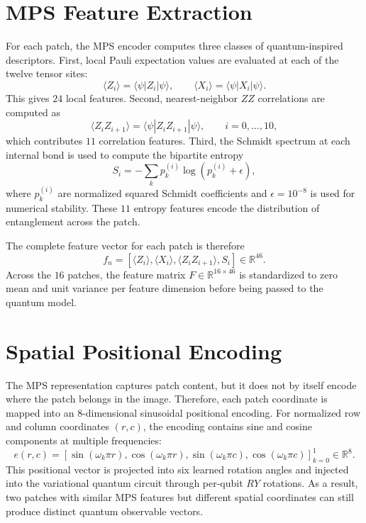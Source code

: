 \documentclass[11pt]{article}
\begin{document}
\section{MPS Feature Extraction}

For each patch, the MPS encoder computes three classes of quantum-inspired descriptors. First, local Pauli expectation values are evaluated at each of the twelve tensor sites:
\begin{equation}
\langle Z_i\rangle = \langle \psi | Z_i | \psi \rangle,
\qquad
\langle X_i\rangle = \langle \psi | X_i | \psi \rangle.
\end{equation}
This gives $24$ local features. Second, nearest-neighbor $ZZ$ correlations are computed as
\begin{equation}
\langle Z_i Z_{i+1}\rangle
= \langle \psi | Z_i Z_{i+1} | \psi \rangle,
\qquad i=0,\ldots,10,
\end{equation}
which contributes $11$ correlation features. Third, the Schmidt spectrum at each internal bond is used to compute the bipartite entropy
\begin{equation}
S_i = -\sum_k p_k^{(i)} \log \left(p_k^{(i)} + \epsilon\right),
\end{equation}
where $p_k^{(i)}$ are normalized squared Schmidt coefficients and $\epsilon=10^{-8}$ is used for numerical stability. These $11$ entropy features encode the distribution of entanglement across the patch.

The complete feature vector for each patch is therefore
\begin{equation}
f_n =
\left[
\langle Z_i\rangle,
\langle X_i\rangle,
\langle Z_i Z_{i+1}\rangle,
S_i
\right]
\in \mathbb{R}^{46}.
\end{equation}
Across the $16$ patches, the feature matrix $F \in \mathbb{R}^{16 \times 46}$ is standardized to zero mean and unit variance per feature dimension before being passed to the quantum model.

\section{Spatial Positional Encoding}

The MPS representation captures patch content, but it does not by itself encode where the patch belongs in the image. Therefore, each patch coordinate is mapped into an $8$-dimensional sinusoidal positional encoding. For normalized row and column coordinates $(r,c)$, the encoding contains sine and cosine components at multiple frequencies:
\begin{equation}
e(r,c) =
\left[
\sin(\omega_k \pi r),
\cos(\omega_k \pi r),
\sin(\omega_k \pi c),
\cos(\omega_k \pi c)
\right]_{k=0}^{1}
\in \mathbb{R}^{8}.
\end{equation}
This positional vector is projected into six learned rotation angles and injected into the variational quantum circuit through per-qubit $RY$ rotations. As a result, two patches with similar MPS features but different spatial coordinates can still produce distinct quantum observable vectors.
\end{document}
